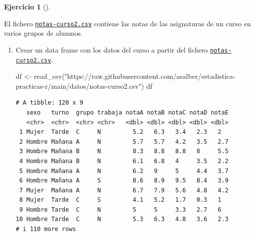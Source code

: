 \documentclass[
  a4paper,
]{scrreport}
\newenvironment{Shaded}{\begin{snugshade}}{\end{snugshade}}
\newcommand{\FunctionTok}[1]{\textcolor[rgb]{0.28,0.35,0.67}{#1}}
\newcommand{\NormalTok}[1]{\textcolor[rgb]{0.00,0.23,0.31}{#1}}
\newcommand{\OtherTok}[1]{\textcolor[rgb]{0.00,0.23,0.31}{#1}}
\newcommand{\StringTok}[1]{\textcolor[rgb]{0.13,0.47,0.30}{#1}}
\theoremstyle{definition}
\newtheorem{exercise}{Ejercicio}[chapter]
\theoremstyle{remark}
\begin{document}
\begin{exercise}[]\protect\hypertarget{exr-preprocesamiento-3}{}\label{exr-preprocesamiento-3}

El fichero \href{datos/notas-curso2.csv}{\texttt{notas-curso2.csv}}
contiene las notas de las asignaturas de un curso en varios grupos de
alumnos.

\begin{enumerate}
\def\labelenumi{\alph{enumi}.}
\item
  Crear un data frame con los datos del curso a partir del fichero
  \href{datos/notas-curso2.csv}{\texttt{notas-curso2.csv}}.

  \begin{tcolorbox}[enhanced jigsaw, toprule=.15mm, rightrule=.15mm, arc=.35mm, colback=white, colbacktitle=quarto-callout-tip-color!10!white, toptitle=1mm, left=2mm, colframe=quarto-callout-tip-color-frame, opacityback=0, breakable, opacitybacktitle=0.6, bottomtitle=1mm, titlerule=0mm, title=\textcolor{quarto-callout-tip-color}{\faLightbulb}\hspace{0.5em}{Solución}, bottomrule=.15mm, coltitle=black, leftrule=.75mm]

\begin{Shaded}
\begin{Highlighting}[]
\NormalTok{df }\OtherTok{\textless{}{-}} \FunctionTok{read\_csv}\NormalTok{(}\StringTok{"https://raw.githubusercontent.com/asalber/estadistica{-}practicas{-}r/main/datos/notas{-}curso2.csv"}\NormalTok{)}
\NormalTok{df}
\end{Highlighting}
\end{Shaded}

\begin{verbatim}
# A tibble: 120 x 9
   sexo   turno  grupo trabaja notaA notaB notaC notaD notaE
   <chr>  <chr>  <chr> <chr>   <dbl> <dbl> <dbl> <dbl> <dbl>
 1 Mujer  Tarde  C     N         5.2   6.3   3.4   2.3   2  
 2 Hombre Mañana A     N         5.7   5.7   4.2   3.5   2.7
 3 Hombre Mañana B     N         8.3   8.8   8.8   8     5.5
 4 Hombre Mañana B     N         6.1   6.8   4     3.5   2.2
 5 Hombre Mañana A     N         6.2   9     5     4.4   3.7
 6 Hombre Mañana A     S         8.6   8.9   9.5   8.4   3.9
 7 Mujer  Mañana A     N         6.7   7.9   5.6   4.8   4.2
 8 Mujer  Tarde  C     S         4.1   5.2   1.7   0.3   1  
 9 Hombre Tarde  C     N         5     5     3.3   2.7   6  
10 Hombre Tarde  C     N         5.3   6.3   4.8   3.6   2.3
# i 110 more rows
\end{verbatim}


\end{tcolorbox}
\end{enumerate}
\end{exercise}
\end{document}
